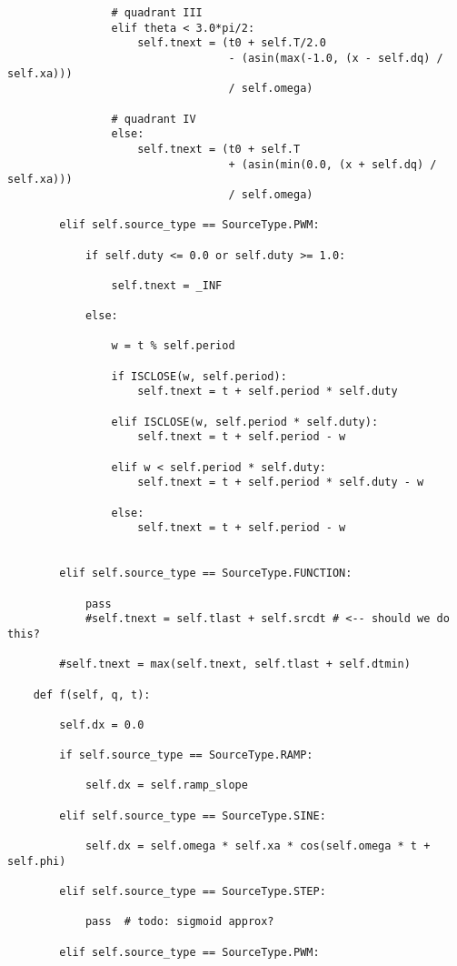 \begin{lstlisting}
                # quadrant III
                elif theta < 3.0*pi/2:
                    self.tnext = (t0 + self.T/2.0
                                  - (asin(max(-1.0, (x - self.dq) / self.xa)))
                                  / self.omega)

                # quadrant IV
                else:
                    self.tnext = (t0 + self.T
                                  + (asin(min(0.0, (x + self.dq) / self.xa)))
                                  / self.omega)

        elif self.source_type == SourceType.PWM:

            if self.duty <= 0.0 or self.duty >= 1.0:

                self.tnext = _INF

            else:

                w = t % self.period

                if ISCLOSE(w, self.period):
                    self.tnext = t + self.period * self.duty

                elif ISCLOSE(w, self.period * self.duty):
                    self.tnext = t + self.period - w

                elif w < self.period * self.duty:
                    self.tnext = t + self.period * self.duty - w

                else:
                    self.tnext = t + self.period - w


        elif self.source_type == SourceType.FUNCTION:

            pass
            #self.tnext = self.tlast + self.srcdt # <-- should we do this?

        #self.tnext = max(self.tnext, self.tlast + self.dtmin)

    def f(self, q, t):

        self.dx = 0.0

        if self.source_type == SourceType.RAMP:

            self.dx = self.ramp_slope

        elif self.source_type == SourceType.SINE:

            self.dx = self.omega * self.xa * cos(self.omega * t + self.phi)

        elif self.source_type == SourceType.STEP:

            pass  # todo: sigmoid approx?

        elif self.source_type == SourceType.PWM:


\end{lstlisting}

